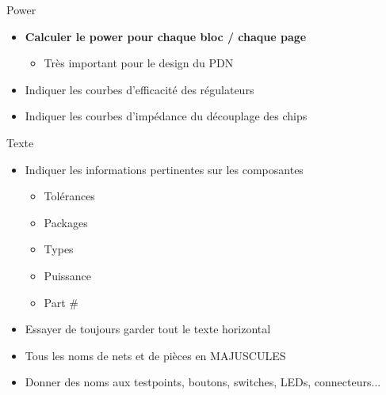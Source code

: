 \begin{frame}[plain]
\end{frame}

\begin{frame}{Power}
    \begin{twocolumns}[0.66]
        \leftcol
        \begin{itemize}
            \item \textbf{Calculer le power pour chaque bloc / chaque page}
            \begin{itemize}
                \item Très important pour le design du PDN
            \end{itemize}
            \item Indiquer les courbes d'efficacité des régulateurs
            \item Indiquer les courbes d'impédance du découplage des chips
        \end{itemize}
        \rightcol
    \end{twocolumns}
    \vfill
\end{frame}

\begin{frame}[plain]
\end{frame}

\begin{frame}{Texte}
    \begin{twocolumns}[0.8]
        \leftcol
        \begin{itemize}
            \item Indiquer les informations pertinentes sur les composantes
            \begin{itemize}
                \item Tolérances
                \item Packages
                \item Types
                \item Puissance
                \item Part \#
            \end{itemize}
            \item Essayer de toujours garder tout le texte horizontal
            \item Tous les noms de nets et de pièces en MAJUSCULES
            \item Donner des noms aux testpoints, boutons, switches, LEDs, connecteurs...
        \end{itemize}

        \rightcol
        \vspace{-24pt}
    \end{twocolumns}
\end{frame}

